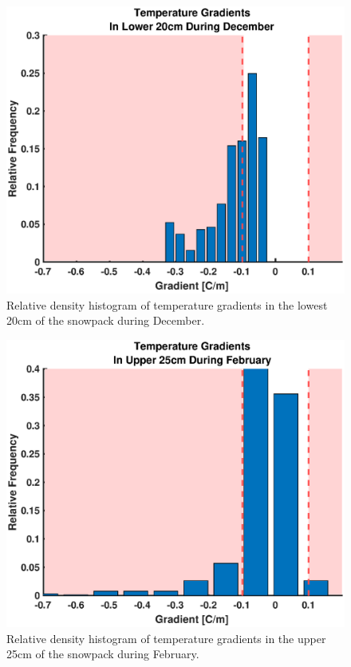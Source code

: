   \begin{figure}[H]
    \centering
    \includegraphics[width=0.7\linewidth]{figures/TempGrad/Dec_L20_RDH.eps}
    \caption{Relative density histogram of temperature gradients in the lowest 20cm of the snowpack during December.}
    \label{fig:Dec_L20_RDH}
 \end{figure}
 
  \begin{figure}[H]
    \centering
    \includegraphics[width=0.7\linewidth]{figures/TempGrad/Feb_U25_RDH.eps}
    \caption{Relative density histogram of temperature gradients in the upper 25cm of the snowpack during February.}
    \label{fig:Feb_U25_RDH}
 \end{figure}
 
